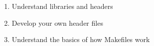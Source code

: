 \begin{Goals}
    \begin{enumerate}
        \item Understand libraries and headers
        \item Develop your own header files
        \item Understand the basics of how Makefiles work
    \end{enumerate}
\end{Goals}
    